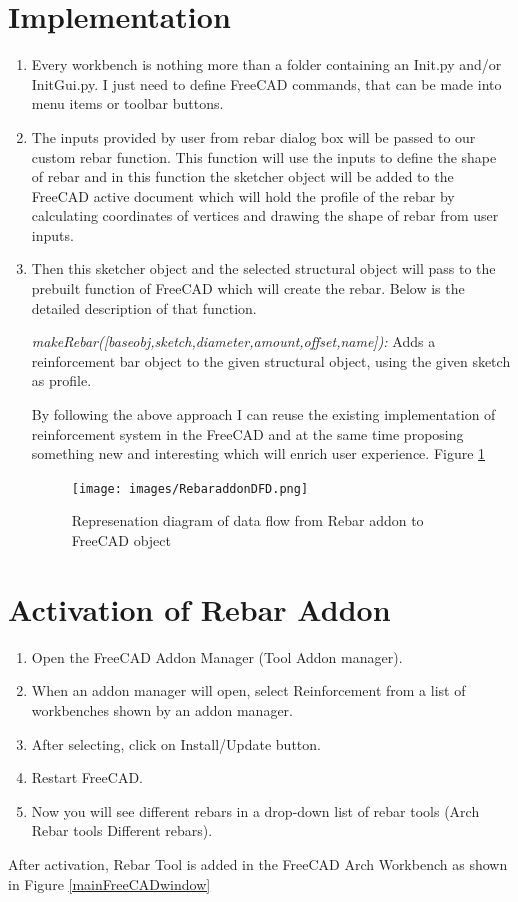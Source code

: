 \section{Implementation}

\begin{enumerate}
\item Every workbench is nothing more than a folder containing an Init.py and/or InitGui.py. I just need to define FreeCAD commands, that can be made into menu items or toolbar buttons.

\item The inputs provided by user from rebar dialog box will be passed to our custom rebar function. This function will use the inputs to define the shape of rebar and in this function the sketcher object will be added to the FreeCAD active document which will hold the profile of the rebar by calculating coordinates of vertices and drawing the shape of rebar from user inputs.

\item Then this sketcher object and the selected structural object will pass to the prebuilt function of FreeCAD which will create the rebar. Below is the detailed description of that function.

\textit{makeRebar([baseobj,sketch,diameter,amount,offset,name]):} Adds a reinforcement bar object to the given structural object, using the given sketch as profile.

By following the above approach I can reuse the existing implementation of reinforcement system in the FreeCAD and at the same time proposing something new and interesting which will enrich user experience. Figure \ref{fig:flow}

\begin{figure}
    \centering \texttt{[image: images/RebaraddonDFD.png]}
    \caption{Represenation diagram of data flow from Rebar addon to FreeCAD object}
    \label{fig:flow}
\end{figure}
\end{enumerate}

\section{Activation of Rebar Addon}
\begin{enumerate}
\item Open the FreeCAD Addon Manager (Tool \textrightarrow  Addon manager).
\item When an addon manager will open, select Reinforcement from a list of workbenches shown by an addon manager.
\item After selecting, click on Install/Update button.
\item Restart FreeCAD.
\item Now you will see different rebars in a drop-down list of rebar tools (Arch \textrightarrow Rebar tools \textrightarrow Different rebars).
\end{enumerate}
After activation, Rebar Tool is added in the FreeCAD Arch Workbench as shown in Figure \ref{mainFreeCADwindow}

